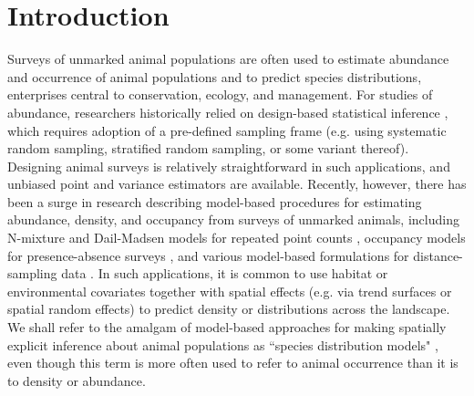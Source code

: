 \documentclass[times,mee,doublespace,]{besauth2}
\begin{document}

\maketitle \linenumbers

\def\VAR{{\rm Var}\,}
\def\COV{{\rm Cov}\,}
\def\Prob{{\rm P}\,}
\def\bfX{\bf X}
\def\bfbeta{\boldsymbol{\beta}}
\def\bfdelta{\boldsymbol{\delta}}
\def\bfeta{\boldsymbol{\eta}}



\section{Introduction}

Surveys of unmarked animal populations are often used to estimate abundance and occurrence of animal populations and to predict species distributions, enterprises central to conservation, ecology, and management. For studies of abundance, researchers historically relied on design-based statistical inference \citep[e.g.][]{Cochran1977}, which requires adoption of a pre-defined sampling frame (e.g. using systematic random sampling, stratified random sampling, or some variant thereof).  Designing animal surveys is relatively straightforward in such applications, and unbiased point and variance estimators are available.  Recently, however, there has been a surge in research describing model-based procedures for estimating abundance, density, and occupancy from surveys of unmarked animals, including N-mixture and Dail-Madsen models for repeated point counts \citep{Royle2004a,DailMadsen2011}, occupancy models for presence-absence surveys \citep{MacKenzie2002,JohnsonEtAl2013}, and various model-based formulations for distance-sampling data \citep{HedleyBuckland2004,JohnsonEtAl2010,MillerEtAl2013}.  In such applications, it is common to use habitat or environmental covariates together with spatial effects (e.g. via trend surfaces or spatial random effects) to predict density or distributions across the landscape.  We shall refer to the amalgam of model-based approaches for making spatially explicit inference about animal populations as ``species distribution models" \citep[SDMs; {\it sensu}][]{ElithLeathwick2009}, even though this term is more often used to refer to animal occurrence than it is to density or abundance.
\end{document}

